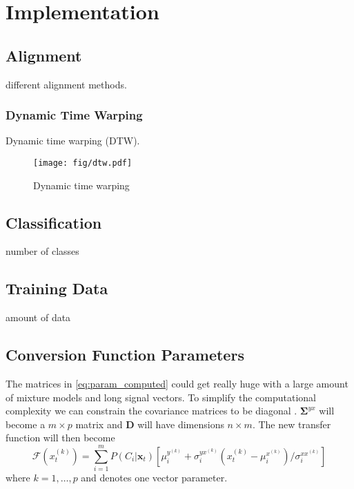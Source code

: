 \chapter{Implementation} %
\label{cha:implementation}
\section{Alignment} %
\label{sec:alignment}
different alignment methods.

\subsection{Dynamic Time Warping} %
\label{sub:dynamic_time_warping}
Dynamic time warping (DTW).
\begin{figure}[htbp]
	\begin{center}
		\texttt{[image: fig/dtw.pdf]}
		\caption{Dynamic time warping}
		\label{fig:dtw}
	\end{center}
\end{figure}



\section{Classification} %
\label{sec:classification}
number of classes

\section{Training Data} %
\label{sec:training_data}
amount of data

\section{Conversion Function Parameters} %
\label{sec:conversion_function_parameters}
The matrices in \eqref{eq:param_computed} could get really huge with a large amount of mixture models and long signal vectors. To simplify the computational complexity we can constrain the covariance matrices to be diagonal \cite{stylianou98}. $\mathbf{\Sigma}^{yx}$ will become a $m\times p$ matrix and $\mathbf{D}$ will have dimensions $n\times m$. The new transfer function will then become
\begin{equation}
	\mathcal{F}(x_t^{(k)}) = \sum_{i=1}^{m}P(C_i \vert \mathbf{x}_t)[\mu_i^{y^{(k)}} + \sigma_i^{yx^{(k)}}  (x_t^{(k)}-\mu_i^{x^{(k)}})/\sigma_i^{xx^{(k)}}]
\end{equation}
where $k=1,\dots,p$ and denotes one vector parameter.

